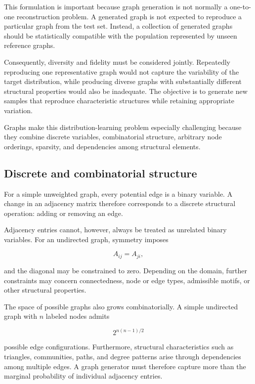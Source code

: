This formulation is important because graph generation is not normally a one-to-one reconstruction problem. A generated graph is not expected to reproduce a particular graph from the test set. Instead, a collection of generated graphs should be statistically compatible with the population represented by unseen reference graphs.

Consequently, diversity and fidelity must be considered jointly. Repeatedly reproducing one representative graph would not capture the variability of the target distribution, while producing diverse graphs with substantially different structural properties would also be inadequate. The objective is to generate new samples that reproduce characteristic structures while retaining appropriate variation.

Graphs make this distribution-learning problem especially challenging because they combine discrete variables, combinatorial structure, arbitrary node orderings, sparsity, and dependencies among structural elements.


\subsection{Discrete and combinatorial structure}
\label{subsec:discrete_combinatorial_structure}

For a simple unweighted graph, every potential edge is a binary variable. A change in an adjacency matrix therefore corresponds to a discrete structural operation: adding or removing an edge.

Adjacency entries cannot, however, always be treated as unrelated binary variables. For an undirected graph, symmetry imposes

\[
A_{ij}=A_{ji},
\]

and the diagonal may be constrained to zero. Depending on the domain, further constraints may concern connectedness, node or edge types, admissible motifs, or other structural properties.

The space of possible graphs also grows combinatorially. A simple undirected graph with \(n\) labeled nodes admits

\[
2^{n(n-1)/2}
\]

possible edge configurations. Furthermore, structural characteristics such as triangles, communities, paths, and degree patterns arise through dependencies among multiple edges. A graph generator must therefore capture more than the marginal probability of individual adjacency entries.


